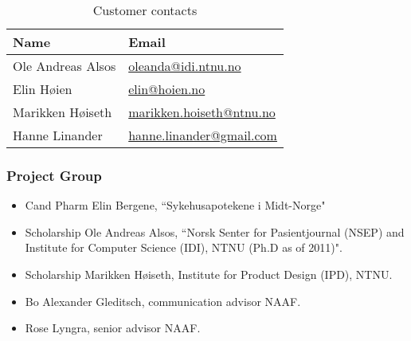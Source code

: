 \begin{table}[h!]
	\begin{center}
		\begin{tabular}{|p{4cm}|p{7cm}|}   
			\hline      
			\bf{Name} & \bf{Email} \\ 
			\hline
			Ole Andreas Alsos & \href{mailto:oleanda@idi.ntnu.no}{oleanda@idi.ntnu.no}  \\     
			\hline
			Elin Høien & \href{mailto:elin@hoien.no}{elin@hoien.no}
			\\
			\hline
			Marikken Høiseth &
			\href{mailto:marikken.hoiseth@ntnu.no}{marikken.hoiseth@ntnu.no}\\
			\hline
			Hanne Linander &
			\href{mailto:hanne.linander@gmail.com}{hanne.linander@gmail.com}
			\\
			\hline
		 \end{tabular}
	\end{center}
	\caption{Customer contacts}
	\label{tab:customercontacts}
\end{table}
\subsubsection{Project Group}
\begin{itemize}
  	\item Cand Pharm Elin Bergene, ``Sykehusapotekene i Midt-Norge" \\
	\item Scholarship Ole Andreas Alsos, ``Norsk Senter for Pasientjournal (NSEP) and Institute for Computer Science (IDI), NTNU (Ph.D as of 2011)".
	\item Scholarship Marikken Høiseth, Institute for Product Design (IPD), NTNU.
	\item Bo Alexander Gleditsch, communication advisor NAAF.
	\item Rose Lyngra, senior advisor NAAF.
\end{itemize}

